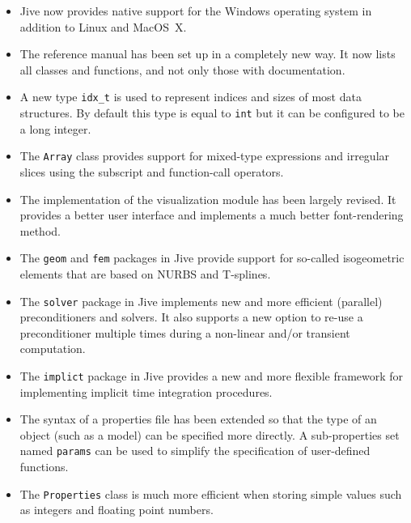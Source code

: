 \documentclass[a4paper]{article}
\newcommand{\Code}[1]{\texttt{#1}}
\begin{document}
\begin{itemize}

  \item Jive now provides native support for the Windows operating system
    in addition to Linux and MacOS~X.

  \item The reference manual has been set up in a completely new way. It
    now lists all classes and functions, and not only those with
    documentation.

  \item A new type \Code{idx\_t} is used to represent indices and sizes
    of most data structures. By default this type is equal to \Code{int}
    but it can be configured to be a long integer.

  \item The \Code{Array} class provides support for mixed-type
    expressions and irregular slices using the subscript and
    function-call operators.

  \item The implementation of the visualization module has been largely
    revised. It provides a better user interface and implements a much
    better font-rendering method.

  \item The \Code{geom} and \Code{fem} packages in Jive provide support
    for so-called isogeometric elements that are based on NURBS and
    T-splines.

  \item The \Code{solver} package in Jive implements new and more
    efficient (parallel) preconditioners and solvers. It also supports a
    new option to re-use a preconditioner multiple times during a
    non-linear and/or transient computation.

  \item The \Code{implict} package in Jive provides a new and more
    flexible framework for implementing implicit time integration
    procedures.

  \item The syntax of a properties file has been extended so that the
    type of an object (such as a model) can be specified more directly. A
    sub-properties set named \Code{params} can be used to simplify
    the specification of user-defined functions.

  \item The \Code{Properties} class is much more efficient when storing
    simple values such as integers and floating point numbers.


\end{itemize}
\end{document}
